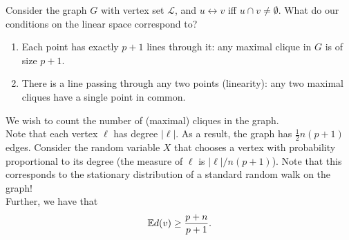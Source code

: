 \documentclass{article}
\begin{document}
	Consider the graph $G$ with vertex set $\mathcal{L}$, and $u \leftrightarrow v$ iff $u \cap v \ne \emptyset$. What do our conditions on the linear space correspond to?
	\begin{enumerate}
		\item Each point has exactly $p+1$ lines through it: any maximal clique in $G$ is of size $p+1$.
		\item There is a line passing through any two points (linearity): any two maximal cliques have a single point in common.
	\end{enumerate}

	We wish to count the number of (maximal) cliques in the graph.\\
	Note that each vertex $\ell$ has degree $|\ell|$. As a result, the graph has $\frac{1}{2}n(p+1)$ edges.
	Consider the random variable $X$ that chooses a vertex with probability proportional to its degree (the measure of ${\ell}$ is $|\ell|/n(p+1)$). Note that this corresponds to the stationary distribution of a standard random walk on the graph!\\
	Further, we have that
	\[ \mathbb{E} d(v) \ge \frac{p+n}{p+1}. \]
	
\end{document}
